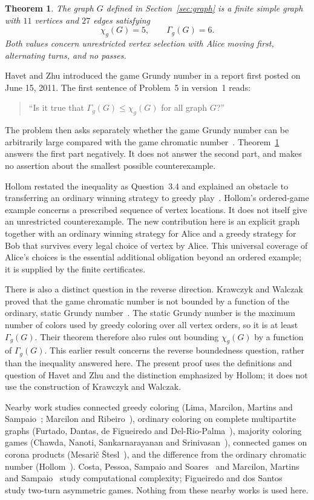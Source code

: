 \documentclass[11pt]{article}
\newtheorem{theorem}{Theorem}
\newcommand{\chig}{\chi_g}
\newcommand{\Gammag}{\Gamma_g}
\begin{document}
\begin{theorem}\label{thm:main}
The graph $G$ defined in Section~\ref{sec:graph} is a finite simple graph
with $11$ vertices and $27$ edges satisfying
\[
             \chig(G)=5, \qquad \Gammag(G)=6.
\]
Both values concern unrestricted vertex selection with Alice
moving first, alternating turns, and no passes.
\end{theorem}

Havet and Zhu introduced the game Grundy number in a report first posted
on June 15, 2011. The first sentence of Problem~5 in version~1 reads:
\begin{quote}
``Is it true that $\Gamma_g(G)\leq\chi_g(G)$ for all graph $G$?''
\end{quote}
The problem then asks separately whether the game Grundy number can be
arbitrarily large compared with the game chromatic number~\cite[p.~6]{HZ}.
Theorem~\ref{thm:main} answers the first part negatively. It does not
answer the second part, and makes no assertion about the smallest
possible counterexample.

Hollom restated the inequality as Question~3.4 and explained an obstacle
to transferring an ordinary winning strategy to greedy
play~\cite{Hollom}. Hollom's ordered-game example concerns a prescribed
sequence of vertex locations. It does not itself give an unrestricted
counterexample. The new contribution here is an explicit graph together
with an ordinary winning strategy for Alice and a greedy strategy for Bob
that survives every legal choice of vertex by Alice. This universal
coverage of Alice's choices is the essential additional obligation beyond
an ordered example; it is supplied by the finite certificates.

There is also a distinct question in the reverse direction. Krawczyk
and Walczak proved that the game chromatic number is not bounded by a
function of the ordinary, static Grundy number~\cite[Theorem~7]{KW}.
The static Grundy number is the maximum number of colors used by greedy
coloring over all vertex orders, so it is at least $\Gammag(G)$.
Their theorem therefore also rules out bounding $\chig(G)$ by a function
of $\Gammag(G)$. This earlier result concerns the reverse boundedness
question, rather than the inequality answered here. The present proof
uses the definitions and question of Havet and Zhu and the distinction
emphasized by Hollom; it does not use the construction of Krawczyk and
Walczak.

Nearby work studies connected greedy coloring (Lima, Marcilon, Martins
and Sampaio~\cite{LMMS}; Marcilon and Ribeiro~\cite{MR}), ordinary coloring
on complete multipartite graphs (Furtado, Dantas, de Figueiredo and
Del-Rio-Palma~\cite{FDDP}), majority coloring games (Chawda, Nanoti,
Sankarnarayanan and Srinivasan~\cite{CNSS}), connected games on corona
products (Mesari\v{c} \v{S}tesl~\cite{MS}), and the difference from the ordinary
chromatic number (Hollom~\cite{HollomGap}). Costa, Pessoa, Sampaio and
Soares~\cite{CPSS} and Marcilon, Martins and Sampaio~\cite{MMS} study
computational complexity; Figueiredo and dos Santos~\cite{FS} study
two-turn asymmetric games. Nothing from these nearby works is used here.
\end{document}
